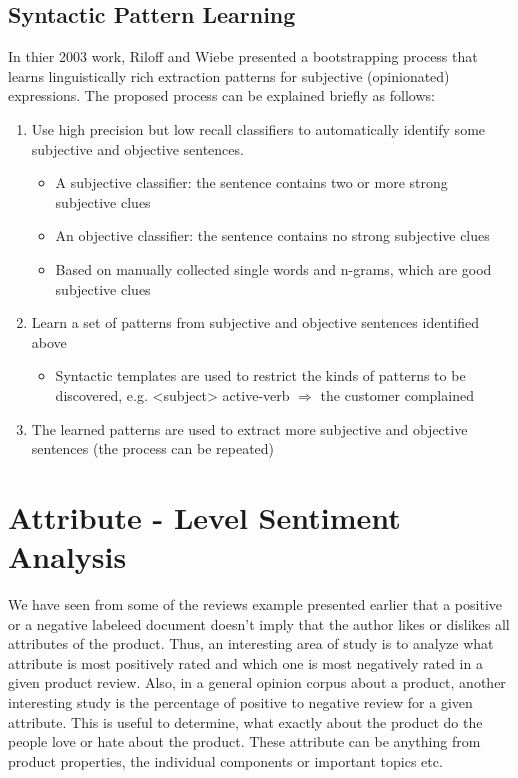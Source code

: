 \subsection{Syntactic Pattern Learning}
In thier 2003 work, Riloff and Wiebe presented a bootstrapping process that learns linguistically rich extraction patterns for subjective (opinionated) expressions. The proposed process can be explained briefly as follows: 
\begin{enumerate}
\item Use high precision but low recall classifiers to automatically identify some subjective and objective sentences.
\begin{itemize}
\item A subjective classifier: the sentence contains two or more strong subjective clues
\item An objective classifier: the sentence contains no strong subjective clues
\item Based on manually collected single words and n-grams, which are good subjective clues
\end{itemize}
\item Learn a set of patterns from subjective and objective sentences identified above
\begin{itemize}
\item Syntactic templates are used to restrict the kinds of patterns to be discovered, e.g. <subject> active-verb $\Rightarrow$ the customer complained
\end{itemize}
\item The learned patterns are used to extract more subjective and objective sentences (the process can be repeated)
\end{enumerate}  

\section{Attribute - Level Sentiment Analysis}
We have seen from some of the reviews example presented earlier that a positive or a negative labeleed document doesn't imply that the author likes or dislikes all attributes of the product. Thus, an interesting area of study is to analyze what attribute is most positively rated and which one is most negatively rated in a given product review. Also, in a general opinion corpus about a product, another interesting study is the percentage of positive to negative review for a given attribute. This is useful to determine, what exactly about the product do the people love or hate about the product. These attribute can be anything from product properties, the individual components or important topics etc. 


